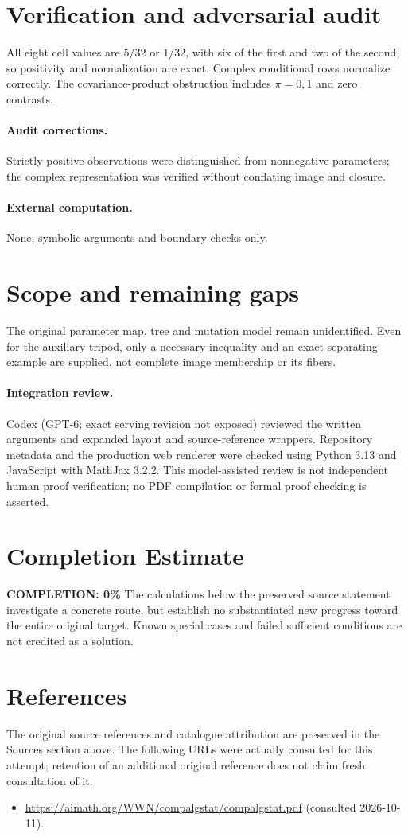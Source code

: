 \documentclass[11pt]{article}
\begin{document}
\section{Verification and adversarial audit}
All eight cell values are $5/32$ or $1/32$, with six of the first and two
of the second, so positivity and normalization are exact. Complex conditional
rows normalize correctly. The covariance-product obstruction includes
$\pi=0,1$ and zero contrasts.
\paragraph{Audit corrections.} Strictly positive observations were distinguished from nonnegative parameters; the complex representation was verified without conflating image and closure.
\paragraph{External computation.} None; symbolic arguments and boundary checks only.
\section{Scope and remaining gaps}
The original parameter map, tree and mutation model remain unidentified.
Even for the auxiliary tripod, only a necessary inequality and an exact
separating example are supplied, not complete image membership or its fibers.
\paragraph{Integration review.} Codex (GPT-6; exact serving revision not exposed) reviewed the written arguments and expanded layout and source-reference wrappers. Repository metadata and the production web renderer were checked using Python 3.13 and JavaScript with MathJax 3.2.2. This model-assisted review is not independent human proof verification; no PDF compilation or formal proof checking is asserted.

\section{Completion Estimate}
\noindent\textbf{COMPLETION: 0\%}
The calculations below the preserved source statement investigate a concrete route,
but establish no substantiated new progress toward the entire original target.
Known special cases and failed sufficient conditions are not credited as a solution.
\section{References}
The original source references and catalogue attribution are preserved in the
Sources section above. The following URLs were actually consulted for this attempt;
retention of an additional original reference does not claim fresh consultation of it.
\begin{itemize}
\item \url{https://aimath.org/WWN/compalgstat/compalgstat.pdf} (consulted 2026-10-11). 
\end{itemize}
\end{document}
